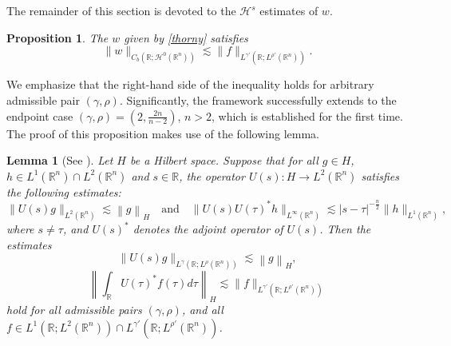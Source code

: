 \documentclass[preprint,compress,12pt]{elsarticle}
\newtheorem{lemma}[theorem]{Lemma}
\newtheorem{proposition}[theorem]{Proposition}
\numberwithin{equation}{section}
\begin{document}
The remainder of this section is devoted to the $\mathcal{H}^{s}$ estimates of $w$.

\begin{proposition}\label{peony}
	The $w$ given by \eqref{thorny} satisfies
	\begin{equation}\label{cope}	
		\|w\|_{C_{b}(\mathbb{R};\mathcal{H}^{0}(\mathbb{R}^{n}))}\lesssim \|f\|_{L^{\gamma'}(\mathbb{R};L^{\rho'}(\mathbb{R}^{n}))}.
	\end{equation}
\end{proposition}
We emphasize that the right-hand side of the inequality holds for arbitrary admissible pair $(\gamma,\rho)$. Significantly, the framework successfully extends to the endpoint case $(\gamma,\rho)=\left(2,\frac{2n}{n-2}\right)$, $n>2$, which is established for the first time. The proof of this proposition makes use of the following lemma.
\begin{lemma}[See \cite{tao}]\label{tas}
	Let $H$ be a Hilbert space. Suppose that for all $g\in H$, $h\in L^{1}(\mathbb{R}^{n})\cap L^{2}(\mathbb{R}^{n})$ and $s\in\mathbb{R}$, the operator $U(s): H\rightarrow L^{2}(\mathbb{R}^{n})$ satisfies the following estimates:
	\begin{equation}\label{thrift}
		\|U(s)g\|_{L^{2}(\mathbb{R}^{n})}\lesssim \left\|g\right\|_{H} \quad\text{and}\quad
		\|U(s)U(\tau)^{*}h\|_{L^{\infty}(\mathbb{R}^{n})}\lesssim |s-\tau|^{-\frac{n}{2}} \|h\|_{L^{1}(\mathbb{R}^{n})},
	\end{equation}
	where $s\neq\tau$, and $U(s)^{*}$ denotes the adjoint operator of  $U(s)$. Then the estimates
	\begin{equation}\label{alloy}
		\|U(s) g\|_{L^{\gamma}(\mathbb{R};L^{\rho}(\mathbb{R}^{n}))}\lesssim \left\|g\right\|_{H},
	\end{equation}
	\begin{equation}\label{utter}
		\left\|\int_{\mathbb{R}} U(\tau)^{*}f(\tau)d\tau\right\|_{H}\lesssim \|f\|_{L^{\gamma'}(\mathbb{R};L^{\rho'}(\mathbb{R}^{n}))}
	\end{equation}
	hold for all admissible pairs $(\gamma,\rho)$, and all $f\in L^{1}(\mathbb{R};L^{2}(\mathbb{R}^{n}))\cap L^{\gamma'}(\mathbb{R};L^{\rho'}(\mathbb{R}^{n}))$.
\end{lemma}
\end{document}
